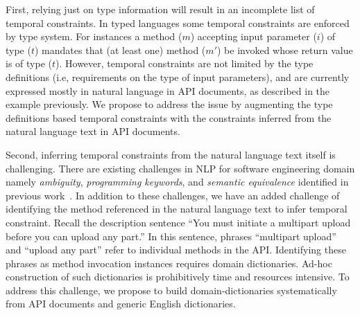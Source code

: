 First, relying just on type information will result in an incomplete list of temporal constraints. 
In typed languages some temporal constraints are enforced by type system. 
For instances a method ($m$) accepting input parameter ($i$) of type ($t$) mandates that (at least one) method ($m'$) be invoked whose return value is of type ($t$).
However, temporal constraints are not limited by the type definitions (i.e, requirements on the type of input parameters), and are currently expressed mostly in natural language in API documents, as described in the example previously.
We propose to address the issue by augmenting the type definitions based temporal constraints with the constraints inferred from
the natural language text in API documents.

Second, inferring temporal constraints from the natural language text itself is challenging. 
There are existing challenges in NLP for software engineering domain namely \textit{ambiguity}, \textit{programming keywords}, and \textit{semantic equivalence} identified in previous work~\cite{pandita12:inferring}.
In addition to these challenges, we have an added challenge of identifying the method referenced in the natural language text to infer temporal constraint.
Recall the description sentence ``You must initiate a multipart upload before you can upload any part.''
In this sentence, phrases ``multipart upload'' and ``upload any part'' refer to individual methods in the API.
Identifying these phrases as method invocation instances requires domain dictionaries.
Ad-hoc construction of such dictionaries is prohibitively time and resources intensive.
To address this challenge, we propose to build domain-dictionaries systematically from API documents and generic English dictionaries.  

